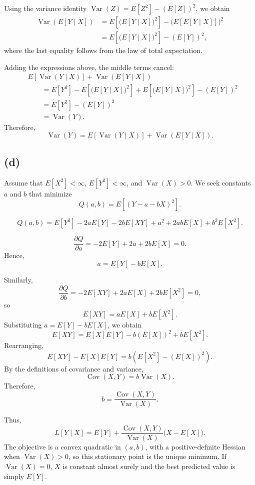 \documentclass[11pt,a4paper]{article}
\begin{document}
Using the variance identity
\(\operatorname{Var}(Z)=E[Z^2]-(E[Z])^2\), we obtain
\[
\begin{aligned}
\operatorname{Var}(E[Y\mid X])
&=
E\!\left[\bigl(E[Y\mid X]\bigr)^2\right]
-
\bigl(E[E[Y\mid X]]\bigr)^2\\
&=
E\!\left[\bigl(E[Y\mid X]\bigr)^2\right]
-
(E[Y])^2,
\end{aligned}
\]
where the last equality follows from the law of total expectation.

Adding the expressions above, the middle terms cancel:
\[
\begin{aligned}
&E[\operatorname{Var}(Y\mid X)]
+\operatorname{Var}(E[Y\mid X])\\
&\qquad=
E[Y^2]
-
E\!\left[\bigl(E[Y\mid X]\bigr)^2\right]
+
E\!\left[\bigl(E[Y\mid X]\bigr)^2\right]
-
(E[Y])^2\\
&\qquad=
E[Y^2]-(E[Y])^2\\
&\qquad=
\operatorname{Var}(Y).
\end{aligned}
\]
Therefore,
\[
\operatorname{Var}(Y)
=
E[\operatorname{Var}(Y\mid X)]
+
\operatorname{Var}(E[Y\mid X]).
\]
\subsection*{(d)}

Assume that \(E[X^2]<\infty\), \(E[Y^2]<\infty\), and
\(\operatorname{Var}(X)>0\). We seek constants \(a\) and \(b\)
that minimize
\[
Q(a,b)=E[(Y-a-bX)^2].
\]

\[
Q(a,b)
=
E[Y^2]-2aE[Y]-2bE[XY]
+a^2+2abE[X]+b^2E[X^2].
\]

\[
\frac{\partial Q}{\partial a}
=
-2E[Y]+2a+2bE[X]=0.
\]
Hence,
\[
a=E[Y]-bE[X].
\]

Similarly,
\[
\frac{\partial Q}{\partial b}
=
-2E[XY]+2aE[X]+2bE[X^2]=0,
\]
so
\[
E[XY]=aE[X]+bE[X^2].
\]
Substituting \(a=E[Y]-bE[X]\), we obtain
\[
E[XY]
=
E[X]E[Y]-b(E[X])^2+bE[X^2].
\]
Rearranging,
\[
E[XY]-E[X]E[Y]
=
b\left(E[X^2]-(E[X])^2\right).
\]
By the definitions of covariance and variance,
\[
\operatorname{Cov}(X,Y)=b\operatorname{Var}(X).
\]
Therefore,
\[
b=\frac{\operatorname{Cov}(X,Y)}{\operatorname{Var}(X)}.
\]

Thus,
\[
L[Y\mid X]
=
E[Y]
+\frac{\operatorname{Cov}(X,Y)}{\operatorname{Var}(X)}
\bigl(X-E[X]\bigr).
\]
The objective is a convex quadratic in \((a,b)\), with a positive-definite
Hessian when \(\operatorname{Var}(X)>0\), so this stationary point is the
unique minimum. If \(\operatorname{Var}(X)=0\), \(X\) is constant almost
surely and the best predicted value is simply \(E[Y]\).
\end{document}
